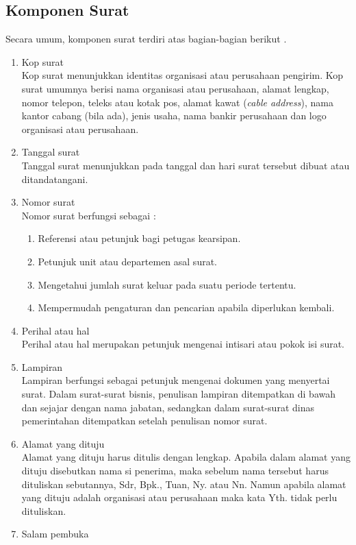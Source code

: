 \subsection{Komponen Surat}
\label{sec:komponen_surat}
Secara umum, komponen surat terdiri atas bagian-bagian berikut \cite{Marjo:2005}.
\begin{enumerate}
	\item Kop surat\\
	Kop surat menunjukkan identitas organisasi atau perusahaan pengirim. Kop surat umumnya berisi nama organisasi atau perusahaan, alamat lengkap, nomor telepon, teleks atau kotak pos, alamat kawat (\textit{cable address}), nama kantor cabang (bila ada), jenis usaha, nama bankir perusahaan dan logo organisasi atau perusahaan.
	\item Tanggal surat\\
	Tanggal surat menunjukkan pada tanggal dan hari surat tersebut dibuat atau ditandatangani.
	\item Nomor surat\\
	Nomor surat berfungsi sebagai :
	\begin{enumerate}
		\item Referensi atau petunjuk bagi petugas kearsipan.
		\item Petunjuk unit atau departemen asal surat.
		\item Mengetahui jumlah surat keluar pada suatu periode tertentu.
		\item Mempermudah pengaturan dan pencarian apabila diperlukan kembali.
	\end{enumerate}
	\item Perihal atau hal\\
	Perihal atau hal merupakan petunjuk mengenai intisari atau pokok isi surat.
	\item Lampiran\\
	Lampiran berfungsi sebagai petunjuk mengenai dokumen yang menyertai surat. Dalam surat-surat bisnis, penulisan lampiran ditempatkan di bawah dan sejajar dengan nama jabatan, sedangkan dalam surat-surat dinas pemerintahan ditempatkan setelah penulisan nomor surat.
	\item Alamat yang dituju\\
	Alamat yang dituju harus ditulis dengan lengkap. Apabila dalam alamat yang dituju disebutkan nama si penerima, maka sebelum nama tersebut harus dituliskan sebutannya, Sdr, Bpk., Tuan, Ny. atau Nn. Namun apabila alamat yang dituju adalah organisasi atau perusahaan maka kata Yth. tidak perlu dituliskan.
	\item Salam pembuka\\

\end{enumerate}
